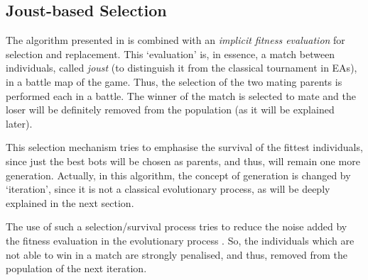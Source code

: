 \documentclass[conference]{IEEEtran}
\begin{document}
\subsection{Joust-based Selection}
The algorithm presented in \cite{GarciaGP14} %
is combined with an \textit{implicit fitness evaluation} for selection and
replacement. This `evaluation' is, in essence, a match between individuals, called {\em joust} (to distinguish it from the classical tournament in EAs), in a battle map of the game.
Thus, the selection of the two mating parents is performed each in a battle. The winner of the match is selected to mate
and the loser will be definitely removed from the population (as it will be explained later).



This selection mechanism tries to emphasise the survival of the fittest individuals, since just the best bots will be chosen as parents, and thus, will remain one more generation. Actually, in this algorithm, the concept of generation is changed by `iteration', since it is not a classical evolutionary process, as will be deeply explained in the next section.

The use of such a selection/survival process tries to reduce the noise added by the fitness evaluation in the evolutionary process \cite{Genebot_JCST}. So, the individuals which are not able to win in a match are strongly penalised, and thus, removed from the population of the next iteration.

\end{document}
